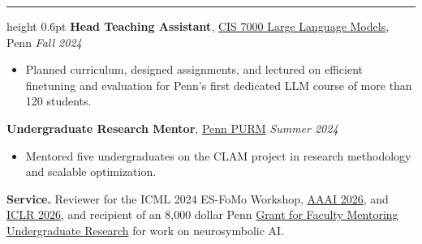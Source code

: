 \documentclass[letterpaper,11pt]{article}
\newenvironment{tight}{%
  \begin{itemize}\setlength{\itemsep}{0pt}\setlength{\parsep}{0pt}\setlength{\topsep}{1pt}}%
  {\end{itemize}}
\newcommand{\rsection}[1]{%
  \vspace{5pt}{\scshape\Large #1}\par\vspace{2pt}\hrule height 0.6pt\vspace{3pt}}
\newcommand{\linkhref}[2]{\textcolor{linkblue}{\href{#1}{#2}}}
\begin{document}
\rsection{Teaching and Service}
\textbf{Head Teaching Assistant}, \linkhref{https://llm-class.github.io}{CIS 7000 Large Language Models}, Penn \hfill \textit{\small Fall 2024}
\begin{tight}
  \item Planned curriculum, designed assignments, and lectured on efficient finetuning and evaluation for Penn's first dedicated LLM course of more than 120 students.
\end{tight}

\vspace{3pt}
\textbf{Undergraduate Research Mentor}, \linkhref{https://curf.upenn.edu/content/penn-undergraduate-research-mentoring-program-purm}{Penn PURM} \hfill \textit{\small Summer 2024}
\begin{tight}
  \item Mentored five undergraduates on the CLAM project in research methodology and scalable optimization.
\end{tight}

\vspace{3pt}
\textbf{Service.} Reviewer for the ICML 2024 ES-FoMo Workshop, \linkhref{https://aaai.org/conference/aaai/aaai-26/}{AAAI 2026}, and \linkhref{https://iclr.cc/Conferences/2026}{ICLR 2026}, and recipient of an 8,000 dollar Penn \linkhref{https://curf.upenn.edu/content/grants-faculty-mentoring-undergraduate-research}{Grant for Faculty Mentoring Undergraduate Research} for work on neurosymbolic AI.
\end{document}
